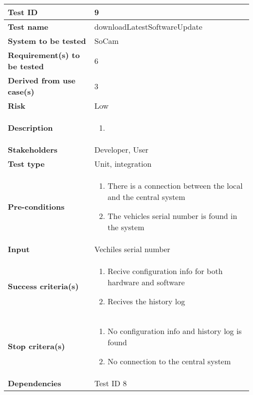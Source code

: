 	\begin{table}[H]
			\begin{tabular}{| p{4cm} | p{10cm} |}
			\hline
			\rowcolor{gray}
				{\bf Test ID} & 9 \\ \hline
				{\bf Test name} & downloadLatestSoftwareUpdate \\ \hline
				{\bf System to be tested} & SoCam \\ \hline
				{\bf Requirement(s) to be tested} & 6 \\ \hline
				{\bf Derived from use case(s)} & 3 \\ \hline
				{\bf Risk} & Low \\  \hline
				{\bf Description} & 
					\begin{enumerate}
						\item
					\end{enumerate}
				\\ \hline
				{\bf Stakeholders} & Developer, User \\ \hline
				{\bf Test type} & Unit, integration \\ \hline
				{\bf Pre-conditions} & 
					\begin{enumerate}
						\item There is a connection between the local and the central system
						\item The vehicles serial number is found in the system
					\end{enumerate}\\ \hline
				{\bf Input} &  Vechiles serial number \\ \hline
				{\bf Success criteria(s)} & 
					\begin{enumerate}
						\item Recive configuration info for both hardware and software
						\item Recives the history log
					\end{enumerate}
				\\ \hline
				{\bf Stop critera(s)} &  
					\begin{enumerate}
						\item No configuration info and history log is found
						\item No connection to the central system
					\end{enumerate} \\ \hline
				{\bf Dependencies} & Test ID 8 \\ \hline
			\end{tabular}
		\end{table}

